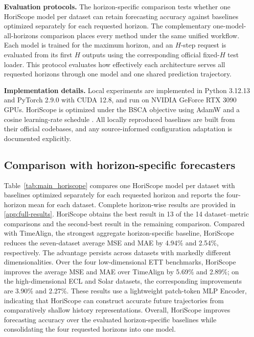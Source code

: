 \textbf{Evaluation protocols.} The horizon-specific comparison tests whether one HoriScope model per dataset can retain forecasting accuracy against baselines optimized separately for each requested horizon. The complementary one-model-all-horizons comparison places every method under the same unified workflow. Each model is trained for the maximum horizon, and an $H$-step request is evaluated from its first $H$ outputs using the corresponding official fixed-$H$ test loader. This protocol evaluates how effectively each architecture serves all requested horizons through one model and one shared prediction trajectory.

\textbf{Implementation details.} Local experiments are implemented in Python 3.12.13 and PyTorch 2.9.0 with CUDA 12.8, and run on NVIDIA GeForce RTX 3090 GPUs. HoriScope is optimized under the BSCA objective using AdamW and a cosine learning-rate schedule \citep{loshchilov2019adamw,loshchilov2017sgdr}. All locally reproduced baselines are built from their official codebases, and any source-informed configuration adaptation is documented explicitly.

\subsection{Comparison with horizon-specific forecasters}
\label{sec:horizon-specific-comparison}





Table~\ref{tab:main_horiscope} compares one HoriScope model per dataset with baselines optimized separately for each requested horizon and reports the four-horizon mean for each dataset. Complete horizon-wise results are provided in \ref{app:full-results}. HoriScope obtains the best result in 13 of the 14 dataset--metric comparisons and the second-best result in the remaining comparison. Compared with TimeAlign, the strongest aggregate horizon-specific baseline, HoriScope reduces the seven-dataset average MSE and MAE by 4.94\% and 2.54\%, respectively. The advantage persists across datasets with markedly different dimensionalities. Over the four low-dimensional ETT benchmarks, HoriScope improves the average MSE and MAE over TimeAlign by 5.69\% and 2.89\%; on the high-dimensional ECL and Solar datasets, the corresponding improvements are 3.90\% and 2.27\%. These results use a lightweight patch-token MLP Encoder, indicating that HoriScope can construct accurate future trajectories from comparatively shallow history representations. Overall, HoriScope improves forecasting accuracy over the evaluated horizon-specific baselines while consolidating the four requested horizons into one model.

